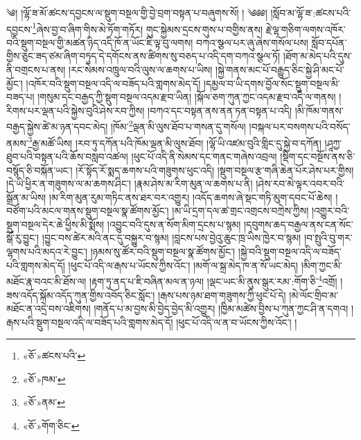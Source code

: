 ༄། །ལྷོ་ཟ་མོ་ཚངས་དབྱངས་ལ་སྡུག་བསྔལ་གྱི་བྱེ་བྲག་བསྟན་པ་བཞུགས་སོ། ། ༄༅༅། །སློབ་མ་ལྷོ་ཟ་:ཚངས་པའི་དབྱངས་\footnote{«ཅོ་»ཚངས་པའི་}ཞེས་བྱ་བ་ཞིག་གིས་མེ་ཏོག་གཏོར། གུང་སྐྱེམས་དྲངས་གུས་པ་བགྱིས་ནས། རྗེ་ལྷ་གཅིག་ལགས་འཁོར་བའི་སྡུག་བསྔལ་གྱི་མཚན་ཉིད་འདི་ཁོ་ན་ཡོང་ཇི་ལྟ་བུ་ལགས། བཀའ་སྩལ་པར་ཞུ་ཞེས་གསོལ་པས། སློབ་དཔོན་གྱིས་ཅུང་ཟད་ཙམ་ཞིག་བཏུད་དེ་དགོངས་ནས་ཚིགས་སུ་བཅད་པ་འདི་དག་བཀའ་སྩལ་ཏོ། །ཐོག་མ་མེད་པའི་དུས་ནི་བགྲངས་པ་ནས། །རང་སེམས་འཁྲུལ་བའི་ལུས་ལ་ཆགས་པ་ཡིས། །སྐྱེ་གནས་མང་པོ་བརྒྱུད་ཅིང་སྐྱེ་ཤི་མང་པོ་མྱོང་། །འཁོར་བའི་སྡུག་བསྔལ་འདི་ལ་བཟོད་པའི་གླགས་མེད་དོ། །དམྱལ་བ་ཡི་དགས་བྱོལ་སོང་སྡུག་བསྔལ་མི་བཟད་པ། །གསུམ་དང་བརྒྱད་ཀྱི་སྡུག་བསྔལ་འདམ་རྫབ་ཡིན། །སྐོལ་ཅག་ཀུན་ཀྱང་འདམ་རྫབ་འདི་ལ་གནས། །རིགས་པར་ལྡན་པའི་སྐྱེས་བུའི་ཤེས་རབ་ཀྱིས། །བཀའ་དང་བསྟན་ནས་ནན་ཏན་བསྟན་པ་འདི། །མི་ཁོམ་གནས་བརྒྱད་སྐྱེས་ཚེ་མ་ཉན་དབང་མེད། །ཁོམ་\footnote{«ཅོ་»ཁམ་}ལྡན་མི་ལུས་ཐོབ་པ་གསན་དུ་གསོལ། །བསྐལ་པར་བསགས་པའི་བསོད་ནམས་\footnote{«ཅོ་»ནམ་}རྒྱ་མཚོ་ཡིས། །རབ་ཏུ་དཀོན་པའི་ཁོམ་ལྡན་མི་ལུས་ཐོབ། །ལྷོ་ཡི་འཛམ་བུའི་གླིང་དུ་སྐྱེ་བ་དཀོན། །ཤཱཀྱ་ཐུབ་པའི་བསྟན་པའི་ཆོས་བསླབ་འཚལ། །ཕུང་པོ་འདི་ནི་སེམས་དང་གནང་གཞེས་འབྲལ། །སྡིག་དང་བསྔོས་ནས་ཅི་བསྙོད་ཅི་བསྐོན་ཡང་། །རོ་སྟོད་རོ་སྨད་ཆགས་པའི་གཟུགས་ཕུང་འདི། །སྡུག་བསྔལ་རྩ་གཞི་ཆེན་པོར་ཤེས་པར་གྱིས། །དེ་ཡི་ཕྱིར་ན་གཟུགས་ལ་མ་ཆགས་ཤིང་། །རྣམ་ཤེས་མ་རིག་མུན་ལ་ཆགས་པ་ནི། །ཤེས་རབ་མེ་ལྟར་འབར་བའི་སྒྲོན་མ་ཡིས། །མ་རིག་མུན་རུམ་གཏིང་ནས་ཐར་བར་འགྱུར། །འདོད་ཆགས་ཞེ་སྡང་གཏི་མུག་དབང་པོ་ཆེས། །བཙོག་པའི་མངལ་གནས་སྡུག་བསྔལ་སྣ་ཚོགས་མྱོང་། །མ་ཡི་དྲག་དལ་ཚ་གྲང་འགྲངས་བཀྲེས་ཀྱིས། །འགྱུར་བའི་སྡུག་བསྔལ་དེར་ཆེ་ཕྱིས་མི་སྨོས། །འབྱུང་བའི་དུས་ན་སོག་མིག་དྲངས་པ་སྙམ། །དབུགས་ཆད་བརྒྱལ་ནས་ངན་སོང་སྒོ་རུ་བྱུང་། །བྱུང་བས་ཚེར་མའི་ནང་དུ་བསྐྱུར་བ་སྙམ། །བླངས་པས་བྱེའུ་ཆུང་ཁྲ་ཡིས་ཁྱེར་བ་སྙམ། །བ་སྤུའི་བུ་གར་ལྷགས་པའི་མདའ་རེ་བྱུང་། །ཉམས་སུ་ཚོར་བའི་སྡུག་བསྔལ་སྣ་ཚོགས་མྱོང་། །སྐྱེ་བའི་སྡུག་བསྔལ་འདི་ལ་བཟོད་པའི་གླགས་མེད་དོ། །ཕུང་པོ་འདི་ལ་རྒས་པ་ཡོངས་ཀྱིས་འོང་། །མགོ་ལ་སྐྲ་མེད་ཁ་ན་སོ་ཡང་མེད། །མིག་ཀྱང་མི་མཐོང་རྣ་བའང་མི་ཐོས་ལ། །རྟག་ཏུ་ནད་པ་ཇི་བཞིན་མལ་ན་ཉལ། །ལྡང་ཡང་མི་ནུས་སྒུར་རམ་:གོག་ཅི་\footnote{«ཅོ་»གོག་ཅིང་}འགྲོ། །ཟས་འདོད་སྐོམ་འདོད་ཀུན་གྱིས་འབོད་ཅིང་སློང་། །རྒས་པས་ཉམ་ཐག་གཟུགས་ཀྱི་ཕུང་པོ་དེ། །མེ་ལོང་གྲིབ་མ་མཐོང་ན་འདྲེ་བས་འཇིགས། །གནོད་པ་མ་བྱས་མི་བྱེད་བྱེད་མི་འགྱུར། །ཁྱིམ་མཚེས་བྱིས་པ་ཀུན་ཀྱང་ཤི་ན་དགའ། །རྒས་པའི་སྡུག་བསྔལ་འདི་ལ་བཟོད་པའི་གླགས་མེད་དོ། །ཕུང་པོ་འདི་ལ་ན་བ་ཡོངས་ཀྱིས་འོང་། །
